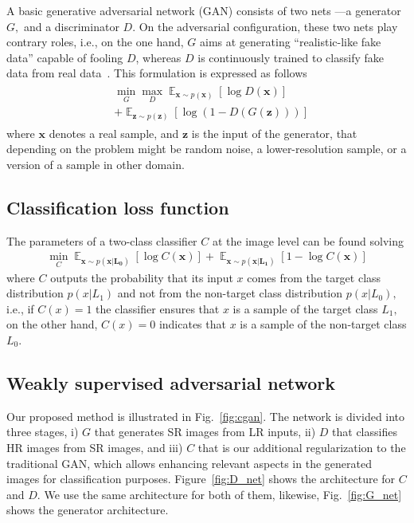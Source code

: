 \documentclass[10pt,twocolumn,letterpaper]{article}
\DeclareMathOperator*{\E}{\mathbb{E}}
\providecommand{\ve}[1]{{\bm{#1}}} %
\begin{document}
A basic generative adversarial network (GAN) consists of two nets ---a generator $G,$ and a discriminator $D$. On the adversarial configuration, these two nets play contrary roles, i.e., on the one hand, $G$ aims at generating ``realistic-like fake data'' capable of fooling $D$, whereas $D$ is continuously trained to classify fake data from real data~\cite{Goodfellow2014}. This formulation is expressed as follows
\begin{eqnarray}
\label{eq:gan}
\begin{aligned}
& \min_G \max_D \E_{\ve{x} \sim p(\ve{x})}[\log D(\ve{x})]\\
& +\E_{\ve{z} \sim p(\ve{z})}[\log (1 - D(G(\ve{z})))]  
\end{aligned}
\end{eqnarray}
where $\ve{x}$ denotes a real sample, and $\ve{z}$ is the input of the generator, that depending on the problem might be random noise, a lower-resolution sample, or a version of a sample in other domain.

\subsection{Classification loss function}

The parameters of a two-class classifier $C$ at the image level can be found solving
\begin{eqnarray}
\label{eq:cnet}
\min_C \E_{\ve{x} \sim p(\ve{x|L_0})}[\log C(\ve{x})] +  \E_{\ve{x} \sim p(\ve{x|L_1})}[1-\log C(\ve{x})]
\end{eqnarray}
where $C$ outputs the probability that its input $x$ comes from the target class distribution $p(x|L_1)$ and not from the non-target class distribution $p(x|L_0),$ i.e., if $C(x)=1$ the classifier ensures that $x$ is a sample of the target class $L_1,$ on the other hand, $C(x)=0$ indicates that $x$ is a sample of the non-target class $L_0$.

\subsection{Weakly supervised adversarial network}

Our proposed method is illustrated in Fig.~\ref{fig:cgan}. The network is divided into three stages, i) $G$ that generates SR images from LR inputs, ii) $D$ that classifies HR images from SR images, and iii) $C$ that is our additional regularization to the traditional GAN, which allows enhancing relevant aspects in the generated images for classification purposes. Figure~\ref{fig:D_net} shows the architecture for $C$ and $D.$ We use the same architecture for both of them, likewise, Fig.~\ref{fig:G_net} shows the generator architecture.
\end{document}
